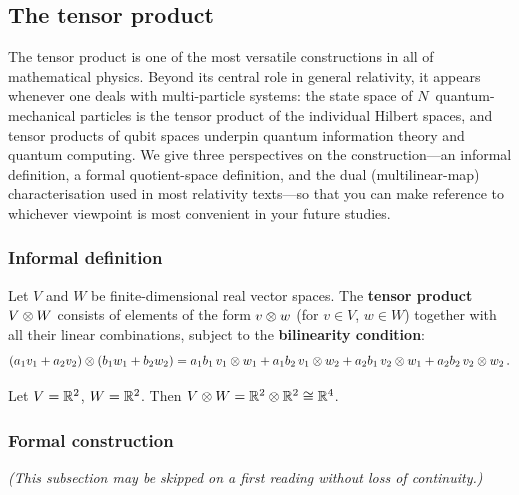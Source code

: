 \subsection{The tensor product}\label{sec:tensor-product}

The tensor product is one of the most versatile constructions in
all of mathematical physics.  Beyond its central role in general
relativity, it appears whenever one deals with multi-particle
systems: the state space of $N$~quantum-mechanical particles is
the tensor product of the individual Hilbert spaces, and tensor
products of qubit spaces underpin quantum information theory and
quantum computing.  We give three perspectives on the
construction---an informal definition, a formal quotient-space
definition, and the dual (multilinear-map) characterisation used in
most relativity texts---so that you can make reference to whichever
viewpoint is most convenient in your future studies.

\subsubsection{Informal definition}

\begin{definition}\label{def:tp-informal}
  Let $V$ and $W$ be finite-dimensional real vector spaces.  The
  \textbf{tensor product} $V\otimes W$ consists of elements of the
  form $v\otimes w$ (for $v\in V$, $w\in W$) together with all their
  linear combinations, subject to the \textbf{bilinearity condition}:
  \begin{equation}\label{eq:bilinearity}
    (a_1 v_1 + a_2 v_2)\otimes(b_1 w_1 + b_2 w_2)
    = a_1 b_1\, v_1\otimes w_1
    + a_1 b_2\, v_1\otimes w_2
    + a_2 b_1\, v_2\otimes w_1
    + a_2 b_2\, v_2\otimes w_2\,.
  \end{equation}
\end{definition}

\begin{example}\label{ex:R2-tensor-R2}
  Let $V = \mathbb{R}^{2}$, $W = \mathbb{R}^{2}$.  Then
  $V\otimes W = \mathbb{R}^{2}\otimes\mathbb{R}^{2} \cong \mathbb{R}^{4}$.
\end{example}

\subsubsection{Formal construction}

\emph{(This subsection may be skipped on a first reading without
loss of continuity.)}


